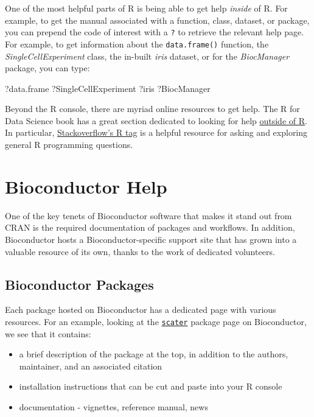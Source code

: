 \documentclass[]{book}
\newenvironment{Shaded}{\begin{snugshade}}{\end{snugshade}}
\newcommand{\NormalTok}[1]{#1}
\providecommand{\tightlist}{%
  \setlength{\itemsep}{0pt}\setlength{\parskip}{0pt}}
\begin{document}
One of the most helpful parts of R is being able to get help \emph{inside} of R. For example, to get the manual associated with a function, class, dataset, or package, you can prepend the code of interest with a \texttt{?} to retrieve the relevant help page. For example, to get information about the \texttt{data.frame()} function, the \emph{SingleCellExperiment} class, the in-built \emph{iris} dataset, or for the \emph{BiocManager} package, you can type:

\begin{Shaded}
\begin{Highlighting}[]
\NormalTok{?data.frame}
\NormalTok{?SingleCellExperiment}
\NormalTok{?iris}
\NormalTok{?BiocManager}
\end{Highlighting}
\end{Shaded}

Beyond the R console, there are myriad online resources to get help. The R for Data Science book has a great section dedicated to looking for help \href{https://r4ds.had.co.nz/introduction.html\#getting-help-and-learning-more}{outside of R}. In particular, \href{https://stackoverflow.com/questions/tagged/r}{Stackoverflow's R tag} is a helpful resource for asking and exploring general R programming questions.

\hypertarget{bioconductor-documentation}{%
\section{Bioconductor Help}\label{bioconductor-documentation}}

One of the key tenets of Bioconductor software that makes it stand out from CRAN is the required documentation of packages and workflows. In addition, Bioconductor hosts a Bioconductor-specific support site that has grown into a valuable resource of its own, thanks to the work of dedicated volunteers.

\hypertarget{bioconductor-packages}{%
\subsection{Bioconductor Packages}\label{bioconductor-packages}}

Each package hosted on Bioconductor has a dedicated page with various resources. For an example, looking at the \href{https://bioconductor.org/packages/release/bioc/html/scater.html}{\texttt{scater}} package page on Bioconductor, we see that it contains:

\begin{itemize}
\tightlist
\item
  a brief description of the package at the top, in addition to the authors, maintainer, and an associated citation
\item
  installation instructions that can be cut and paste into your R console
\item
  documentation - vignettes, reference manual, news
\end{itemize}
\end{document}
